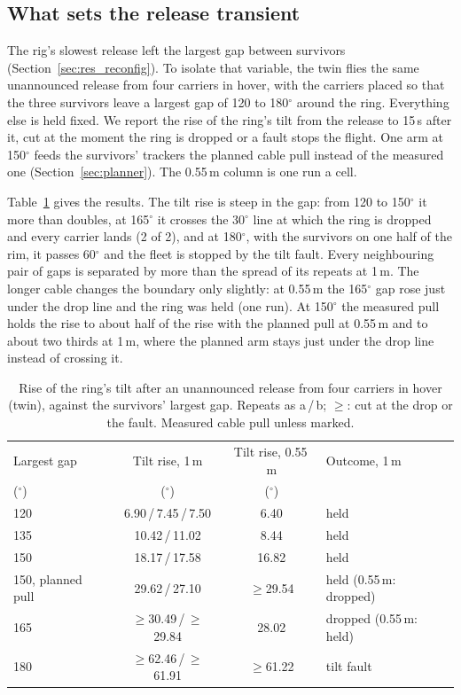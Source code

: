 \subsection{What sets the release transient}
\label{sec:res_release_gap}

The rig's slowest release left the largest gap between survivors (Section~\ref{sec:res_reconfig}). To isolate that
variable, the twin flies the same unannounced release from four carriers in hover, with the carriers placed so that the
three survivors leave a largest gap of 120 to 180$^\circ$ around the ring. Everything else is held fixed. We report the
rise of the ring's tilt from the release to 15\,s after it, cut at the moment the ring is dropped or a fault stops the
flight. One arm at 150$^\circ$ feeds the survivors' trackers the planned cable pull instead of the measured one
(Section~\ref{sec:planner}). The 0.55\,m column is one run a cell.

Table~\ref{tab:release_gap} gives the results. The tilt rise is steep in the gap: from 120 to 150$^\circ$ it more than
doubles, at 165$^\circ$ it crosses the 30$^\circ$ line at which the ring is dropped and every carrier lands (2 of 2),
and at 180$^\circ$, with the survivors on one half of the rim, it passes 60$^\circ$ and the fleet is stopped by the
tilt fault. Every neighbouring pair of gaps is separated by more than the spread of its repeats at 1\,m.
The longer cable changes the boundary only slightly: at 0.55\,m the 165$^\circ$ gap rose just under the drop line
and the ring was held (one run). At 150$^\circ$ the measured pull holds the rise to about half of the rise with the planned pull at 0.55\,m and
to about two thirds at 1\,m, where the planned arm stays just under the drop line instead of crossing it.

\begin{table}[t]
\centering
\footnotesize
\setlength{\tabcolsep}{3pt}
\caption{Rise of the ring's tilt after an unannounced release from four carriers in hover (twin), against the
survivors' largest gap. Repeats as a\,/\,b; $\geq$: cut at the drop or the fault. Measured cable pull unless marked.}
\label{tab:release_gap}
\begin{tabular}{lccl}
\toprule
Largest gap & Tilt rise, 1\,m & Tilt rise, 0.55\,m & Outcome, 1\,m \\
($^\circ$) & ($^\circ$) & ($^\circ$) & \\
\midrule
120 & 6.90\,/\,7.45\,/\,7.50 & 6.40 & held \\
135 & 10.42\,/\,11.02 & 8.44 & held \\
150 & 18.17\,/\,17.58 & 16.82 & held \\
150, planned pull & 29.62\,/\,27.10 & $\geq$29.54 & held (0.55\,m: dropped) \\
165 & $\geq$30.49\,/\,$\geq$29.84 & 28.02 & dropped (0.55\,m: held) \\
180 & $\geq$62.46\,/\,$\geq$61.91 & $\geq$61.22 & tilt fault \\
\bottomrule
\end{tabular}
\end{table}

